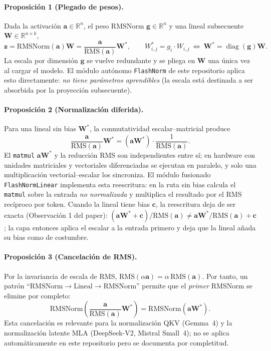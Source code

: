 \paragraph{Proposición 1 (Plegado de pesos).}
Dada la activación $\mathbf{a}\in\mathbb{R}^{n}$, el peso RMSNorm $\mathbf{g}\in\mathbb{R}^{n}$ y una lineal subsecuente $\mathbf{W}\in\mathbb{R}^{n\times k}$,
\[
\mathbf{z}=\mathrm{RMSNorm}(\mathbf{a})\mathbf{W}=\frac{\mathbf{a}}{\mathrm{RMS}(\mathbf{a})}\mathbf{W}^{*},\qquad
W^{*}_{i,j}=g_{i}\cdot W_{i,j}\ \Leftrightarrow\ \mathbf{W}^{*}=\operatorname{diag}(\mathbf{g})\mathbf{W}.
\]
La escala por dimensión $\mathbf{g}$ se vuelve redundante y se pliega en $\mathbf{W}$ una única vez al cargar el modelo. El módulo autónomo \texttt{FlashNorm} de este repositorio aplica esto directamente: \emph{no tiene parámetros aprendibles} (la escala está destinada a ser absorbida por la proyección subsecuente).

\paragraph{Proposición 2 (Normalización diferida).}
Para una lineal sin bias $\mathbf{W}^{*}$, la conmutatividad escalar--matricial produce
\[
\frac{\mathbf{a}}{\mathrm{RMS}(\mathbf{a})}\mathbf{W}^{*}=\left(\mathbf{a}\mathbf{W}^{*}\right)\cdot\frac{1}{\mathrm{RMS}(\mathbf{a})}.
\]
El \texttt{matmul} $\mathbf{a}\mathbf{W}^{*}$ y la reducción RMS son independientes entre sí; en hardware con unidades matriciales y vectoriales diferenciadas se ejecutan en paralelo, y solo una multiplicación vectorial--escalar los sincroniza. El módulo fusionado \texttt{FlashNormLinear} implementa esta reescritura: en la ruta sin bias calcula el \texttt{matmul} sobre la entrada \emph{no normalizada} y multiplica el resultado por el RMS recíproco por token. Cuando la lineal tiene bias $\mathbf{c}$, la reescritura deja de ser exacta (Observación 1 del paper): $\left(\mathbf{a}\mathbf{W}^{*}+\mathbf{c}\right)/\mathrm{RMS}(\mathbf{a})\neq\mathbf{a}\mathbf{W}^{*}/\mathrm{RMS}(\mathbf{a})+\mathbf{c}$; la capa entonces aplica el escalar a la entrada primero y deja que la lineal añada su bias como de costumbre.

\paragraph{Proposición 3 (Cancelación de RMS).}
Por la invariancia de escala de RMS, $\mathrm{RMS}(\alpha\mathbf{a})=\alpha\,\mathrm{RMS}(\mathbf{a})$. Por tanto, un patrón ``$\mathrm{RMSNorm}\to\mathrm{Lineal}\to\mathrm{RMSNorm}$'' permite que el \emph{primer} RMSNorm se elimine por completo:
\[
\mathrm{RMSNorm}\!\left(\frac{\mathbf{a}}{\mathrm{RMS}(\mathbf{a})}\mathbf{W}^{*}\right)=\mathrm{RMSNorm}\!\left(\mathbf{a}\mathbf{W}^{*}\right).
\]
Esta cancelación es relevante para la normalización QKV (Gemma~4) y la normalización latente MLA (DeepSeek-V2, Mistral Small~4); no se aplica automáticamente en este repositorio pero se documenta por completitud.

